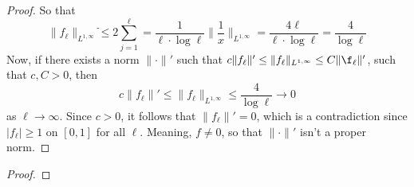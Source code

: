 \documentclass[12pt]{article}
\newenvironment{exercise}[2][Exercise]{\begin{trivlist}
\item[\hskip \labelsep {\bfseries #1}\hskip \labelsep {\bfseries #2.}]}{\end{trivlist}}
\begin{document}
\begin{proof}
  So that
  $$\|f_\ell\|_{L^{1, \infty}} ֿ\le 2 \sum_{j=1}^\ell = \frac{1}{\ell \cdot \log \ell} \|\frac{1}{x}\|_{L^{1, \infty}} = \frac{4 \ell}{\ell \cdot \log \ell} = \frac{4}{\log \ell}$$
  Now, if there exists a norm $\|\cdot\|'$ such that $c\|f_\ell\|' \le \|f_\ell\|_{L^{1, \infty}} \le C\|\f_\ell\|'$, such that $c,C > 0$, then
  $$c\|f_\ell\|' \le \|f_\ell\|_{L^{1, \infty}} \le \dfrac{4}{\log \ell} \rightarrow 0$$
  as $\ell \rightarrow \infty$. Since $c > 0$, it follows that $\|f_\ell\|' = 0$, which is a contradiction since $|f_\ell| \ge 1$ on $[0, 1]$ for all $\ell$. Meaning, $f \ne 0$, so  that $\|\cdot\|'$ isn't a proper  norm.
\end{proof}

\begin{exercise}{3}
\end{exercise}

\begin{proof}
\end{proof}
\end{document}
